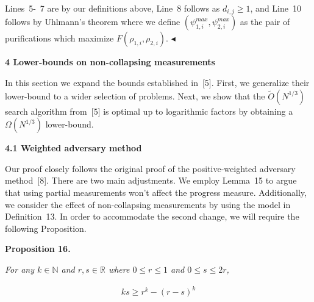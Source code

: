 Lines 5- 7 are by our definitions above, Line 8 follows as $d_{i,j}\geq 1$, and Line 10 follows by Uhlmann’s theorem where we define $(\psi^{max}_{1,i},\psi^{max}_{2,i})$ as the pair of purifications which maximize $F(\rho_{1,i},\rho_{2,i})$.
$\blacktriangleleft$\par






\par\medskip\noindent\textbf{
4 Lower-bounds on non-collapsing measurements}\par




In this section we expand the bounds established in [5]. First, we generalize their lower-bound to a wider selection of problems. Next, we show that the $\tilde{O}(N^{1/3})$ search algorithm from [5] is optimal up to logarithmic factors by obtaining a $\Omega(N^{1/3})$ lower-bound.\par




\par\medskip\noindent\textbf{
4.1 Weighted adversary method}\par




Our proof closely follows the original proof of the positive-weighted adversary method [8]. There are two main adjustments. We employ Lemma 15 to argue that using partial measurements won’t affect the progress measure. Additionally, we consider the effect of non-collapsing measurements by using the model in Definition 13. In order to accommodate the second change, we will require the following Proposition.\par





\par\medskip\noindent\textbf{
\textbf{Proposition 16}\textbf{.}
}\par



\emph{For any $k\in\mathbb{N}$ and $r,s\in\mathbb{R}$ where $0\leq r\leq 1$ and $0\leq s\leq 2r$,}\par


\[\begin{gathered}
\displaystyle ks\geq r^{k}-(r-s)^{k}
\end{gathered}\]






